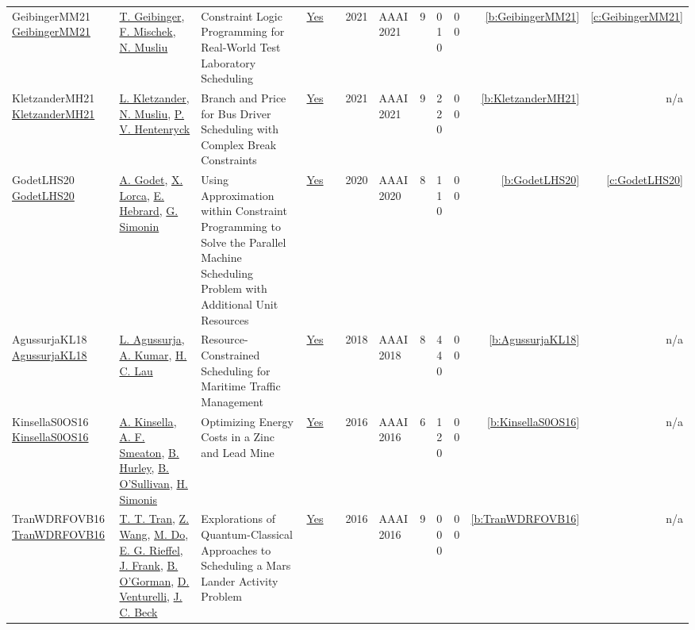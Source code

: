 {\begin{longtable}{>{\raggedright\arraybackslash}p{3cm}>{\raggedright\arraybackslash}p{4.5cm}>{\raggedright\arraybackslash}p{6.0cm}rrrp{2.5cm}rp{1cm}p{1cm}rr}
GeibingerMM21 \href{https://doi.org/10.1609/aaai.v35i7.16789}{GeibingerMM21} & \hyperref[auth:a77]{T. Geibinger}, \hyperref[auth:a80]{F. Mischek}, \hyperref[auth:a45]{N. Musliu} & Constraint Logic Programming for Real-World Test Laboratory Scheduling & \href{../works/GeibingerMM21.pdf}{Yes} & \cite{GeibingerMM21} & 2021 & AAAI 2021 & 9 & 0 1 0 & 0 0 & \ref{b:GeibingerMM21} & \ref{c:GeibingerMM21}\\
KletzanderMH21 \href{https://doi.org/10.1609/aaai.v35i13.17408}{KletzanderMH21} & \hyperref[auth:a78]{L. Kletzander}, \hyperref[auth:a45]{N. Musliu}, \hyperref[auth:a148]{P. V. Hentenryck} & Branch and Price for Bus Driver Scheduling with Complex Break Constraints & \href{../works/KletzanderMH21.pdf}{Yes} & \cite{KletzanderMH21} & 2021 & AAAI 2021 & 9 & 2 2 0 & 0 0 & \ref{b:KletzanderMH21} & n/a\\
GodetLHS20 \href{https://doi.org/10.1609/aaai.v34i02.5510}{GodetLHS20} & \hyperref[auth:a471]{A. Godet}, \hyperref[auth:a244]{X. Lorca}, \hyperref[auth:a1]{E. Hebrard}, \hyperref[auth:a126]{G. Simonin} & Using Approximation within Constraint Programming to Solve the Parallel Machine Scheduling Problem with Additional Unit Resources & \href{../works/GodetLHS20.pdf}{Yes} & \cite{GodetLHS20} & 2020 & AAAI 2020 & 8 & 1 1 0 & 0 0 & \ref{b:GodetLHS20} & \ref{c:GodetLHS20}\\
AgussurjaKL18 \href{https://doi.org/10.1609/aaai.v32i1.12086}{AgussurjaKL18} & \hyperref[auth:a1359]{L. Agussurja}, \hyperref[auth:a1360]{A. Kumar}, \hyperref[auth:a364]{H. C. Lau} & Resource-Constrained Scheduling for Maritime Traffic Management & \href{../works/AgussurjaKL18.pdf}{Yes} & \cite{AgussurjaKL18} & 2018 & AAAI 2018 & 8 & 4 4 0 & 0 0 & \ref{b:AgussurjaKL18} & n/a\\
KinsellaS0OS16 \href{https://doi.org/10.1609/aaai.v30i2.19079}{KinsellaS0OS16} & \hyperref[auth:a1357]{A. Kinsella}, \hyperref[auth:a1358]{A. F. Smeaton}, \hyperref[auth:a885]{B. Hurley}, \hyperref[auth:a16]{B. O'Sullivan}, \hyperref[auth:a17]{H. Simonis} & Optimizing Energy Costs in a Zinc and Lead Mine & \href{../works/KinsellaS0OS16.pdf}{Yes} & \cite{KinsellaS0OS16} & 2016 & AAAI 2016 & 6 & 1 2 0 & 0 0 & \ref{b:KinsellaS0OS16} & n/a\\
TranWDRFOVB16 \href{http://www.aaai.org/ocs/index.php/WS/AAAIW16/paper/view/12664}{TranWDRFOVB16} & \hyperref[auth:a799]{T. T. Tran}, \hyperref[auth:a808]{Z. Wang}, \hyperref[auth:a809]{M. Do}, \hyperref[auth:a810]{E. G. Rieffel}, \hyperref[auth:a379]{J. Frank}, \hyperref[auth:a811]{B. O'Gorman}, \hyperref[auth:a812]{D. Venturelli}, \hyperref[auth:a89]{J. C. Beck} & Explorations of Quantum-Classical Approaches to Scheduling a Mars Lander Activity Problem & \href{../works/TranWDRFOVB16.pdf}{Yes} & \cite{TranWDRFOVB16} & 2016 & AAAI 2016 & 9 & 0 0 0 & 0 0 & \ref{b:TranWDRFOVB16} & n/a\\

\end{longtable}}
